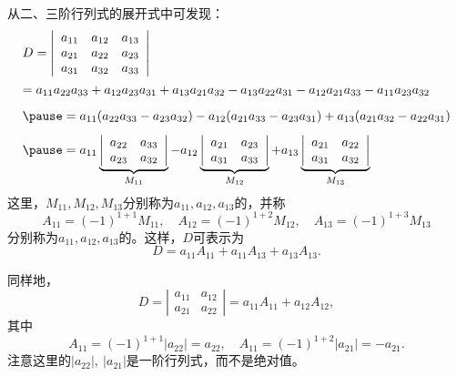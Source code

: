 \begin{frame}
  从二、三阶行列式的展开式中可发现：
  $$
  \begin{array}{l}
    D  =  \left|
    \begin{array}{ccc}
      a_{11} & a_{12} & a_{13}\\
      a_{21} & a_{22} & a_{23}\\
      a_{31} & a_{32} & a_{33}
    \end{array}
    \right| \\[0.6cm]
     = 
    a_{11}a_{22}a_{33}+a_{12}a_{23}a_{31}+a_{13}a_{21}a_{32}
    -a_{13}a_{22}a_{31}-a_{12}a_{21}a_{33}-a_{11}a_{23}a_{32} \\[0.3cm]\pause 
     = 
    a_{11}(a_{22}a_{33}-a_{23}a_{32})-
    a_{12}(a_{21}a_{33}-a_{23}a_{31})+
    a_{13}(a_{21}a_{32}-a_{22}a_{31}) \\[0.3cm] \pause 
     = 
    a_{11} \underbrace{\left| \begin{array}{ccc} a_{22} & a_{33} \\ a_{23} & a_{32} \end{array} \right|}_{M_{11}} -
    a_{12} \underbrace{\left| \begin{array}{ccc} a_{21} & a_{23} \\ a_{31} & a_{33} \end{array} \right|}_{M_{12}} +
    a_{13} \underbrace{\left| \begin{array}{ccc} a_{21} & a_{22} \\ a_{31} & a_{32} \end{array} \right|}_{M_{13}}
  \end{array}
  $$
  \pause 
  这里，$M_{11},M_{12},M_{13}$分别称为$a_{11},a_{12},a_{13}$的，并称
  $$
  A_{11} = (-1)^{1+1} M_{11}, \quad
  A_{12} = (-1)^{1+2} M_{12}, \quad
  A_{13} = (-1)^{1+3} M_{13}
  $$
  分别称为$a_{11},a_{12},a_{13}$的。\pause 这样，$D$可表示为
  $$
  D= a_{11}A_{11} + a_{11}A_{13} + a_{13}A_{13}.
  $$
\end{frame}


\begin{frame}
  同样地，
  $$
  D = \left| \begin{array}{ccc} a_{11} & a_{12} \\ a_{21} & a_{22} \end{array} \right|
  = a_{11} A_{11} + a_{12} A_{12},
  $$
  其中
  $$
  A_{11} = (-1)^{1+1}|a_{22}| =  a_{22},\quad
  A_{11} = (-1)^{1+2}|a_{21}| = -a_{21}.
  $$
  \pause 
  注意这里的$|a_{22}|,~|a_{21}|$是一阶行列式，而不是绝对值。

  \pause 
  \vspace{0.1in}

\end{frame}
